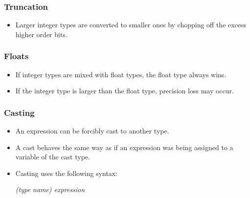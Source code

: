 \documentclass{article}
\begin{document}
\subsubsection{Truncation}

\begin{itemize}
    \item Larger integer types are converted to smaller ones by chopping off the excess higher order bits.
\end{itemize}

\subsubsection{Floats}

\begin{itemize}
    \item If integer types are mixed with float types, the float type always wins.
    \item If the integer type is larger than the float type, precision loss may occur.
\end{itemize}

\subsubsection{Casting}

\begin{itemize}
    \item An expression can be forcibly cast to another type.
    \item A cast behaves the same way as if an expression was being assigned to a variable of the cast type.
    \item Casting uses the following syntax:
    \begin{center}
        \textit{(type name) expression}
    \end{center}
\end{itemize}
\end{document}
